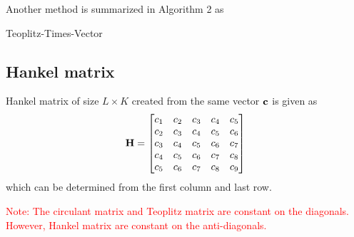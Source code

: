 \documentclass[revised,endfloat]{geophysics}
\DeclarePairedDelimiter\floor{\lfloor}{\rfloor}
\begin{document}
Another method is summarized in Algorithm 2 as 
\begin{algorithm}
      \SetAlgoLined
      \caption{Teoplitz-Times-Vector}
\end{algorithm}

\subsection{Hankel matrix}
Hankel matrix of size $L \times K$ created from the same vector ${\bf c}$ is given as
\begin{equation}
{\bf H} = 
\begin{bmatrix}
c_1 & c_2 & c_3 & c_4 & c_5 \\ 
c_2 & c_3 & c_4 & c_5 & c_6 \\ 
c_3 & c_4 & c_5 & c_6 & c_7 \\ 
c_4 & c_5 & c_6 & c_7 & c_8 \\ 
c_5 & c_6 & c_7 & c_8 & c_9 \\ 
\end{bmatrix}
\label{eq16}
\end{equation}
which can be determined from the first column and last row. 

\textcolor{red}{Note: The circulant matrix and Teoplitz matrix are constant on the diagonals. However, Hankel matrix are constant on the anti-diagonals.}
\end{document}
